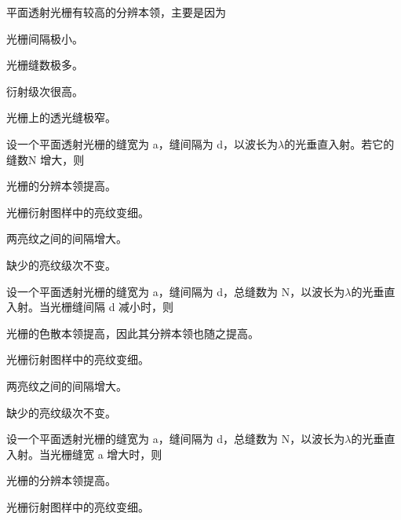 \documentclass[standard, analysis, notocnum]{ExBook}
\newcommand{\answerarea}[1][8cm]{%
  \par\vspace{2mm}%
  \noindent{\color{themeColor!35}\rule{\linewidth}{0.4pt}}\par
  \noindent\begin{minipage}[t][#1][t]{\linewidth}\vspace{0pt}\end{minipage}\par
  \noindent{\color{themeColor!35}\rule{\linewidth}{0.4pt}}\par
}
\begin{document}
\begin{qitems}
\begin{bbox}
\qitem 平面透射光栅有较高的分辨本领，主要是因为
\par\noindent\hspace{2em}光栅间隔极小。
\par\noindent\hspace{2em}光栅缝数极多。
\par\noindent\hspace{2em}衍射级次很高。
\par\noindent\hspace{2em}光栅上的透光缝极窄。
\answerarea[3.5cm]
\end{bbox}
\begin{bbox}
\qitem 设一个平面透射光栅的缝宽为 a，缝间隔为 d，以波长为$\lambda$的光垂直入射。若它的缝数N 增大，则
\par\noindent\hspace{2em}光栅的分辨本领提高。
\par\noindent\hspace{2em}光栅衍射图样中的亮纹变细。
\par\noindent\hspace{2em}两亮纹之间的间隔增大。
\par\noindent\hspace{2em}缺少的亮纹级次不变。
\answerarea[3.5cm]
\end{bbox}
\begin{bbox}
\qitem 设一个平面透射光栅的缝宽为 a，缝间隔为 d，总缝数为 N，以波长为$\lambda$的光垂直入射。当光栅缝间隔 d 减小时，则
\par\noindent\hspace{2em}光栅的色散本领提高，因此其分辨本领也随之提高。
\par\noindent\hspace{2em}光栅衍射图样中的亮纹变细。
\par\noindent\hspace{2em}两亮纹之间的间隔增大。
\par\noindent\hspace{2em}缺少的亮纹级次不变。
\answerarea[3.5cm]
\end{bbox}
\begin{bbox}
\qitem 设一个平面透射光栅的缝宽为 a，缝间隔为 d，总缝数为 N，以波长为$\lambda$的光垂直入射。当光栅缝宽 a 增大时，则
\par\noindent\hspace{2em}光栅的分辨本领提高。
\par\noindent\hspace{2em}光栅衍射图样中的亮纹变细。

\end{bbox}
\end{qitems}
\end{document}
